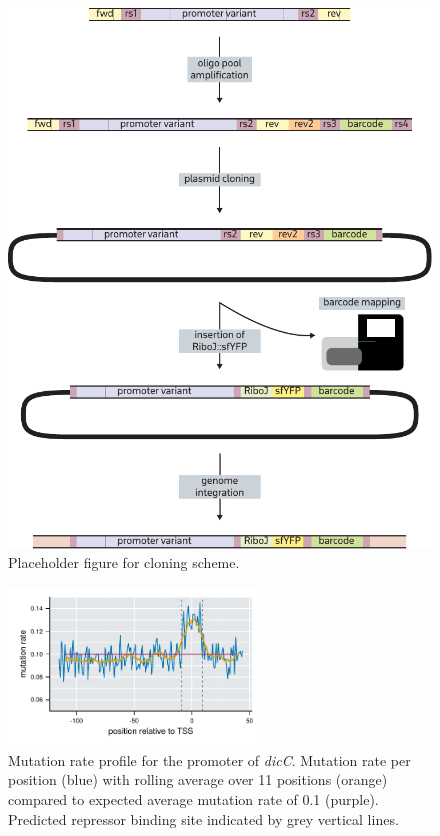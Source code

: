 \begin{figure}
    \centering
    \includegraphics{../figures/cloning_scheme.pdf}
    \caption{Placeholder figure for cloning scheme.}
    \label{fig:cloning}
\end{figure}

\begin{figure}
    \centering
    \includegraphics[width=0.6\textwidth]{../figures/dicCp_mutation_rate_oligos.pdf}
    \caption{Mutation rate profile for the promoter of \textit{dicC}. Mutation rate per position (blue) with rolling average over 11 positions (orange) compared to expected average mutation rate of 0.1 (purple). Predicted repressor binding site indicated by grey vertical lines.}
    \label{fig:dicCp}
\end{figure}